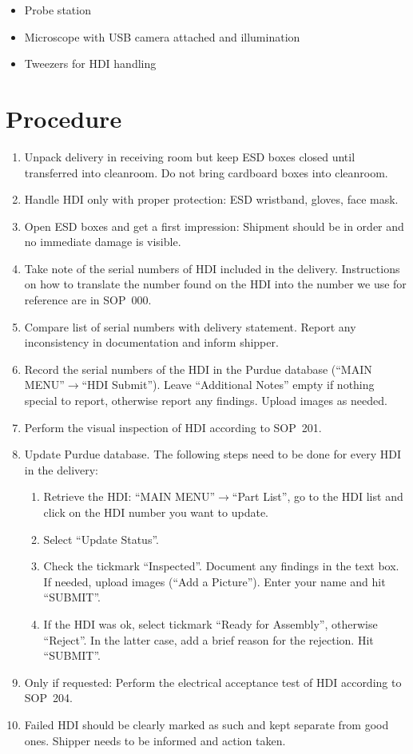 \documentclass[12pt]{unlsilabsop}
\begin{document}
\begin{itemize}
    \item Probe station
    \item Microscope with USB camera attached and illumination
    \item Tweezers for HDI handling
\end{itemize}

\section{Procedure}

\begin{enumerate}
    \item Unpack delivery in receiving room but keep ESD boxes closed until transferred into cleanroom. Do not bring cardboard boxes into cleanroom.
    \item Handle HDI only with proper protection: ESD wristband, gloves, face mask.
    \item Open ESD boxes and get a first impression: Shipment should be in order and no immediate damage is visible.
    \item Take note of the serial numbers of HDI included in the delivery. Instructions on how to translate the number found on the HDI into the number we use for reference are in SOP~000.
    \item Compare list of serial numbers with delivery statement. Report any inconsistency in documentation and inform shipper.
    \item Record the serial numbers of the HDI in the Purdue database (``MAIN MENU''$\rightarrow$``HDI Submit''). Leave ``Additional Notes'' empty if nothing special to report, otherwise report any findings. Upload images as needed.
    \item Perform the visual inspection of HDI according to SOP~201.
    \item Update Purdue database. The following steps need to be done for every HDI in the delivery:
    \begin{enumerate}
        \item Retrieve the HDI: ``MAIN MENU''$\rightarrow$``Part List'', go to the HDI list and click on the HDI number you want to update.
        \item Select ``Update Status''.
        \item Check the tickmark ``Inspected''. Document any findings in the text box. If needed, upload images (``Add a Picture''). Enter your name and hit ``SUBMIT''.
        \item If the HDI was ok, select tickmark ``Ready for Assembly'', otherwise ``Reject''. In the latter case, add a brief reason for the rejection. Hit ``SUBMIT''.
    \end{enumerate}
    \item Only if requested: Perform the electrical acceptance test of HDI according to SOP~204.
    \item Failed HDI should be clearly marked as such and kept separate from good ones. Shipper needs to be informed and action taken.
\end{enumerate}
\end{document}
